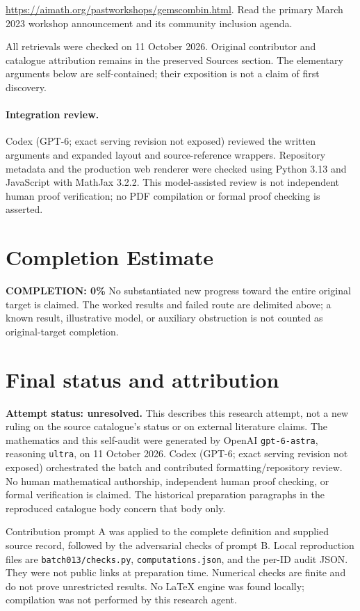 \documentclass[11pt]{article}
\begin{document}
\url{https://aimath.org/pastworkshops/gemscombin.html}. Read the primary March 2023 workshop announcement and its community inclusion agenda.

All retrievals were checked on 11 October 2026. Original contributor and catalogue attribution remains in the preserved Sources section. The elementary arguments below are self-contained; their exposition is not a claim of first discovery.


\paragraph{Integration review.} Codex (GPT-6; exact serving revision not exposed) reviewed the written arguments and expanded layout and source-reference wrappers. Repository metadata and the production web renderer were checked using Python 3.13 and JavaScript with MathJax 3.2.2. This model-assisted review is not independent human proof verification; no PDF compilation or formal proof checking is asserted.

\section{Completion Estimate}
\noindent\textbf{COMPLETION: 0\%}
No substantiated new progress toward the entire original target is claimed. The worked results and failed route are delimited above; a known result, illustrative model, or auxiliary obstruction is not counted as original-target completion.

\section{Final status and attribution}
\textbf{Attempt status: unresolved.} This describes this research attempt, not a new ruling on the source catalogue's status or on external literature claims.
The mathematics and this self-audit were generated by OpenAI \texttt{gpt-6-astra}, reasoning \texttt{ultra}, on 11 October 2026. Codex (GPT-6; exact serving revision not exposed) orchestrated the batch and contributed formatting/repository review. No human mathematical authorship, independent human proof checking, or formal verification is claimed. The historical preparation paragraphs in the reproduced catalogue body concern that body only.

Contribution prompt A was applied to the complete definition and supplied source record, followed by the adversarial checks of prompt B. Local reproduction files are \texttt{batch013/checks.py}, \texttt{computations.json}, and the per-ID audit JSON. They were not public links at preparation time. Numerical checks are finite and do not prove unrestricted results. No LaTeX engine was found locally; compilation was not performed by this research agent.
\end{document}
